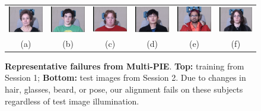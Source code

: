 \begin{figure}
{\begin{tabular}{@{}c@{}c@{}c@{}c@{}c@{}c@{}}
\hspace{-2mm}\includegraphics[width=\tempwidth,clip=true]{figures_pami/multipie_failed/079_02_01_051_08.png}  &
\includegraphics[width=\tempwidth,clip=true]{figures_pami/multipie_failed/111_02_01_051_08.png}  &
\includegraphics[width=\tempwidth,clip=true]{figures_pami/multipie_failed/196_02_01_051_08.png}  &
\includegraphics[width=\tempwidth,clip=true]{figures_pami/multipie_failed/130_02_01_051_08.png}  &
\includegraphics[width=\tempwidth,clip=true]{figures_pami/multipie_failed/163_02_01_051_08.png}  &
\includegraphics[width=\tempwidth,clip=true]{figures_pami/multipie_failed/175_02_01_051_08.png} \\
\hspace{-2mm}(a) & (b) & (c) & (d) & (e) & (f) 
\end{tabular}
}
\caption{\small{\bf Representative failures from Multi-PIE}. {\bf Top:} training from Session 1; {\bf Bottom:} test images from Session 2. Due to changes in hair, glasses, beard, or pose, our alignment fails on these subjects regardless of test image illumination.}
\label{fig:failed-examples}
\end{figure}
